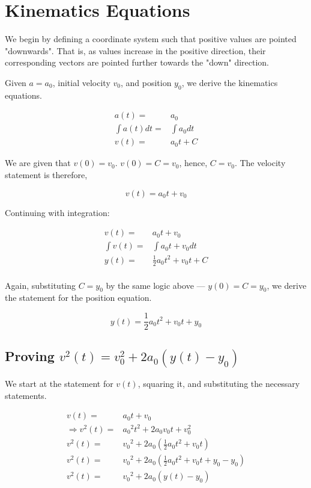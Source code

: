 \documentclass[letterpaper]{article}
\begin{document}
\section{Kinematics Equations}
\label{sec:org085a976}
We begin by defining a coordinate system such that positive values are pointed "downwards". That is, as values increase in the positive direction, their corresponding vectors are pointed further towards the "down" direction.

Given \(a=a_0\), initial velocity \(v_0\), and position \(y_0\), we derive the kinematics equations.

\begin{align}
    a(t) =& a_0 \\
    \int a(t) dt =& \int a_0 dt \\
    v(t) =& a_0t + C 
\end{align}

We are given that \(v(0)=v_0\). \(v(0) = C = v_0\), hence, \(C=v_0\). The velocity statement is therefore,

\begin{equation}
    v(t) = a_0t+v_0
\end{equation}

Continuing with integration:

\begin{align}
    v(t) =& a_0t + v_0 \\
    \int v(t) =& \int a_0t + v_0 dt \\
    y(t) =& \frac{1}{2}a_0t^2+v_0t+C \\
\end{align}

Again, substituting \(C = y_0\) by the same logic above --- \(y(0) = C = y_0\), we derive the statement for the position equation.

\begin{equation}
    y(t) = \frac{1}{2}a_0t^2 + v_0t + y_0
\end{equation}


\subsection{Proving \(v^2(t) = v_0^2 + 2a_0(y(t)-y_0)\)}
\label{sec:org0f35de2}
We start at the statement for \(v(t)\), squaring it, and substituting the necessary statements.

\begin{align}
    v(t) =& a_0t+v_0 \\
    \Rightarrow v^2(t) =& {a_0}^2 t^2 + 2a_0v_0t + v_0^2 \\
    v^2(t) =& {v_0}^2 + 2a_0 (\frac{1}{2} a_0 t^2 + v_0t) \\
    v^2(t) =& {v_0}^2 + 2a_0 (\frac{1}{2} a_0 t^2 + v_0t + y_0 - y_0) \\
    v^2(t) =& {v_0}^2 + 2a_0 (y(t) - y_0) 
\end{align}
\end{document}
